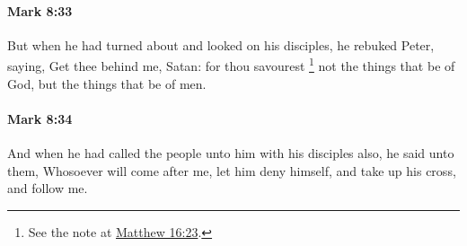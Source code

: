 		\paragraph{Mark 8:33} %
			\label{MARK-8-33}

			But when he had turned about and looked on his disciples, he rebuked Peter, saying, Get thee behind me, Satan: for thou savourest%
				\footnote{%
					See the note at \hyperref[MATTHEW-16-23]{Matthew 16:23}.
					}
			not the things that be of God, but the things that be of men.

			\begin{framed}
			\scriptsize
				\begin{compactdesc}
					\item[SBLG] 
				\end{compactdesc}
			\end{framed}

		\paragraph{Mark 8:34} %
			\label{MARK-8-34}

			And when he had called the people unto him with his disciples also, he said unto them, Whosoever will come after me, let him deny himself, and take up his cross, and follow me.

